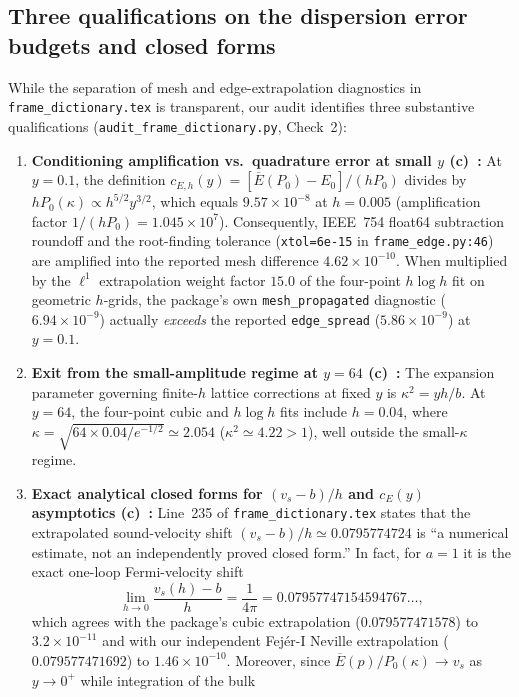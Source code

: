 \documentclass[11pt,a4paper]{article}
\newcommand{\Lc}{\textsf{\textbf{(c)}}\ }
\newcommand{\scr}{\texttt{audit\_\allowbreak frame\_\allowbreak dictionary.py}}
\begin{document}
\subsection{Three qualifications on the dispersion error budgets and closed forms}
While the separation of mesh and edge-extrapolation diagnostics in
\texttt{frame\_\allowbreak dictionary.tex} is transparent, our audit identifies
three substantive qualifications (\scr, Check~2):
\begin{enumerate}
\item \textbf{Conditioning amplification vs.\ quadrature error at small $y$ \Lc:}
At $y=0.1$, the definition $c_{E,h}(y)=[\overline E(P_0)-E_0]/(hP_0)$ divides by
$hP_0(\kappa)\propto h^{5/2}y^{3/2}$, which equals $9.57\times 10^{-8}$ at $h=0.005$
(amplification factor $1/(hP_0)=1.045\times 10^7$). Consequently, IEEE~754 float64
subtraction roundoff and the root-finding tolerance (\texttt{xtol=6e-15} in
\texttt{frame\_\allowbreak edge.py:46}) are amplified into the reported mesh
difference $4.62\times 10^{-10}$. When multiplied by the $\ell^1$ extrapolation
weight factor $15.0$ of the four-point $h\log h$ fit on geometric $h$-grids, the
package's own \texttt{mesh\_propagated} diagnostic ($6.94\times 10^{-9}$) actually
\emph{exceeds} the reported \texttt{edge\_spread} ($5.86\times 10^{-9}$) at $y=0.1$.
\item \textbf{Exit from the small-amplitude regime at $y=64$ \Lc:}
The expansion parameter governing finite-$h$ lattice corrections at fixed $y$ is
$\kappa^2=yh/b$. At $y=64$, the four-point cubic and $h\log h$ fits include $h=0.04$,
where $\kappa=\sqrt{64\times 0.04/e^{-1/2}}\simeq 2.054$ ($\kappa^2\simeq 4.22>1$),
well outside the small-$\kappa$ regime.
\item \textbf{Exact analytical closed forms for $(v_s-b)/h$ and $c_E(y)$ asymptotics \Lc:}
Line~235 of \texttt{frame\_\allowbreak dictionary.tex} states that the extrapolated
sound-velocity shift $(v_s-b)/h\simeq 0.0795774724$ is ``a numerical estimate, not an
independently proved closed form.'' In fact, for $a=1$ it is the exact one-loop
Fermi-velocity shift
\begin{equation}\label{eq:vs_exact}
 \lim_{h\to 0}\frac{v_s(h)-b}{h}=\frac{1}{4\pi}=0.07957747154594767\ldots,
\end{equation}
which agrees with the package's cubic extrapolation ($0.079577471578$) to
$3.2\times 10^{-11}$ and with our independent Fej\'er-I Neville extrapolation
($0.079577471692$) to $1.46\times 10^{-10}$. Moreover, since
$\overline E(p)/P_0(\kappa)\to v_s$ as $y\to 0^+$ while integration of the bulk

\end{enumerate}
\end{document}
